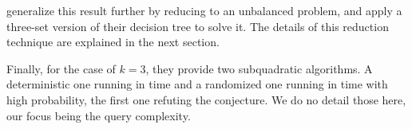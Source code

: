 \citet*{gronlund:2014} generalize this result further by reducing \kLDT to an
unbalanced \threeSUM problem, and apply a three-set version of their decision
tree to solve it. The details of this reduction technique are explained in
the next section.

Finally, for the case of $k = 3$, they provide two subquadratic \threeSUM
algorithms. A deterministic one running in  time and a randomized one running in  time with high probability, the first one refuting the \threeSUM
conjecture. We do no detail those here, our focus being the query complexity.
